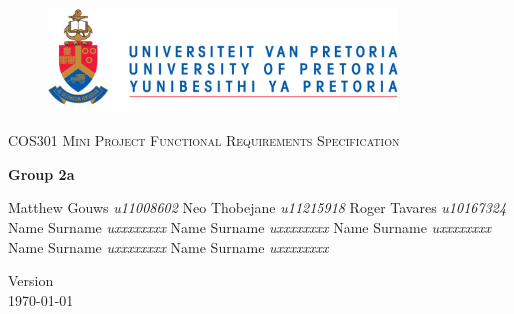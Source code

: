\begin{titlepage}
	\begin{center}
		
		\begin{figure}[t]
			\centering
			\includegraphics[width=350px]{UP_Logo.png}
		\end{figure}
		
		\textsc{\LARGE COS301 Mini Project Functional \newline\newline Requirements Specification}
		
		\textbf{\newline Group 2a} \\
		\begin{flushright} \large
			Matthew Gouws \emph{u11008602} \newline
			Neo Thobejane \emph{u11215918} \newline
			Roger Tavares \emph{u10167324} \newline
			Name Surname \emph{uxxxxxxxx} \newline
			Name Surname \emph{uxxxxxxxx} \newline
			Name Surname \emph{uxxxxxxxx} \newline
			Name Surname \emph{uxxxxxxxx} \newline
			Name Surname \emph{uxxxxxxxx} \newline
		\end{flushright}
		
		\vfill
		
		{\large Version }
		\\
		{\large \today}
		
	\end{center}
\end{titlepage}
